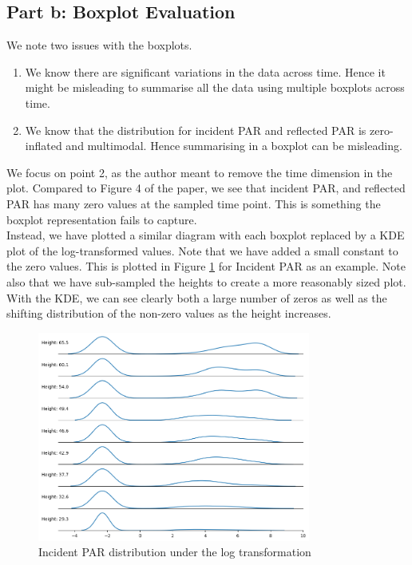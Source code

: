 \documentclass[11pt, letterpaper]{article}
\begin{document}
\subsection{Part b: Boxplot Evaluation}
We note two issues with the boxplots.
\begin{enumerate}
    \item We know there are significant variations in the data across time. Hence it might be misleading to summarise all the data using multiple boxplots across time.
    \item We know that the distribution for incident PAR and reflected PAR is zero-inflated and multimodal. Hence summarising in a boxplot can be misleading.
\end{enumerate}
We focus on point 2, as the author meant to remove the time dimension in the plot. Compared to Figure 4 of the paper, we see that incident PAR, and reflected PAR has many zero values at the sampled time point. This is something the boxplot representation fails to capture. \\
Instead, we have plotted a similar diagram with each boxplot replaced by a KDE plot of the log-transformed values. Note that we have added a small constant to the zero values. This is plotted in Figure \ref{fig:graph_crtique_b} for Incident PAR as an example. Note also that we have sub-sampled the heights to create a more reasonably sized plot. With the KDE, we can see clearly both a large number of zeros as well as the shifting distribution of the non-zero values as the height increases.
\begin{figure}[h!]
\centering
\captionsetup{justification=centering}
\includegraphics[width=0.8\textwidth]{Report Images/Fig7_graph_criqitue_bv2.png}
\caption{Incident PAR distribution under the log transformation}
\label{fig:graph_crtique_b}
\end{figure}
\\
\end{document}
